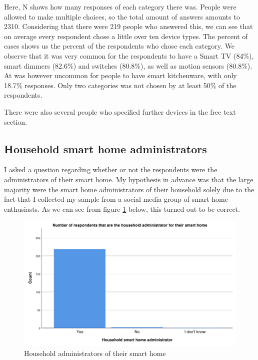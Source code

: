 Here, N shows how many responses of each category there was. People were allowed to make multiple choices, so the total amount of answers amounts to 2310. Considering that there were 219 people who answered this, we can see that on average every respondent chose a little over ten device types. The percent of cases shows us the percent of the respondents who chose each category. We observe that it was very common for the respondents to have a Smart TV (84\%), smart dimmers (82.6\%) and switches (80.8\%), as well as motion sensors (80.8\%). At was however uncommon for people to have smart kitchenware, with only 18.7\% responses. Only two categories was not chosen by at least 50\% of the respondents. 

There were also several people who specified further devices in the free text section. 


\subsection{Household smart home administrators}
I asked a question regarding whether or not the respondents were the administrators of their smart home. My hypothesis in advance was that the large majority were the smart home administrators of their household solely due to the fact that I collected my sample from a social media group of smart home enthusiasts. As we can see from figure \ref{fig:administrator} below, this turned out to be correct. 

\begin{figure}[H]
    \centering
    \includegraphics[scale=0.55]{figures/diagrams/administrator.pdf}
    \caption{Household administrators of their smart home}
    \label{fig:administrator}
\end{figure}

